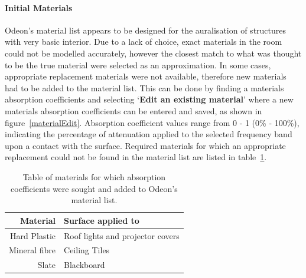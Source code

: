 \documentclass[../../main.tex]{subfiles}
\begin{document}
		\paragraph{Initial Materials}

			Odeon's material list appears to be designed for the auralisation of structures with very basic interior. Due to a lack of choice, exact materials in the room could not be modelled accurately, however the closest match to what was thought to be the true material were selected as an approximation. In some cases, appropriate replacement materials were not available, therefore new materials had to be added to the material list. This can be done by finding a materials absorption coefficients and selecting `\textbf{Edit an existing material}' where a new materials absorption coefficients can be entered and saved, as shown in figure~\ref{materialEdit}. Absorption coefficient values range from 0 - 1 (0\% - 100\%), indicating the percentage of attenuation applied to the selected frequency band upon a contact with the surface. Required materials for which an appropriate replacement could not be found in the material list are listed in table~\ref{materialTable}.

			\begin{table}[H]
			\begin{center}
				\begin{tabular}{r l}
					\textbf{Material} & \textbf{Surface applied to} \\ \hline
					Hard Plastic \cite{plastic} & Roof lights and projector covers \\
					Mineral fibre \cite{mineralFibre} & Ceiling Tiles \\
					Slate \footnotemark[1] \cite{Kovalchik} & Blackboard \\
				\end{tabular}
			\end{center}
			\caption{Table of materials for which absorption coefficients were sought and added to Odeon's material list.}
			\label{materialTable}
			\end{table}

\end{document}
